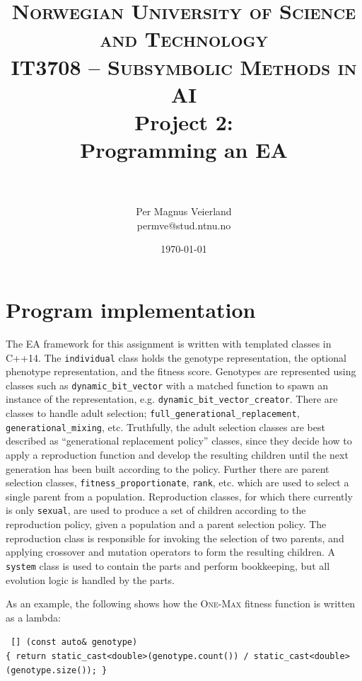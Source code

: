 \documentclass[paper=a4, fontsize=10pt]{scrartcl} %
\title{
\normalfont \normalsize
\textsc{Norwegian University of Science and Technology\\IT3708 -- Subsymbolic Methods in AI}
\horrule{0.5pt} \\[0.4cm]
\huge Project 2:\\ Programming an \acf{EA}\\
\horrule{2pt} \\[0.5cm]
}
\author{Per Magnus Veierland\\permve@stud.ntnu.no}
\date{\normalsize\today}
\begin{document}
\fancyfoot[C]{}
\maketitle

\newpage
{} %
\setcounter{page}{1}

\section*{Program implementation}

\setlength\parindent{17pt}
The \ac{EA} framework for this assignment is written with templated classes in \textsc{C++14}. The \texttt{individual} class holds the genotype representation, the optional phenotype representation, and the fitness score. Genotypes are represented using classes such as \texttt{dynamic\_bit\_vector} with a matched function to spawn an instance of the representation, e.g. \texttt{dynamic\_bit\_vector\_creator}. There are classes to handle adult selection; \texttt{full\_generational\_replacement}, \texttt{generational\_mixing}, etc. Truthfully, the adult selection classes are best described as ``generational replacement policy'' classes, since they decide how to apply a reproduction function and develop the resulting children until the next generation has been built according to the policy. Further there are parent selection classes, \texttt{fitness\_proportionate}, \texttt{rank}, etc. which are used to select a single parent from a population. Reproduction classes, for which there currently is only \texttt{sexual}, are used to produce a set of children according to the reproduction policy, given a population and a parent selection policy. The reproduction class is responsible for invoking the selection of two parents, and applying crossover and mutation operators to form the resulting children. A \texttt{system} class is used to contain the parts and perform bookkeeping, but all evolution logic is handled by the parts.

As an example, the following shows how the \textsc{One-Max} fitness function is written as a lambda:
\setlength\parindent{0pt}

\vspace{-0.35cm}

\begin{center}
{\scriptsize\texttt{
[] (const auto\& genotype)\\
\{ return static\_cast<double>(genotype.count()) / static\_cast<double>(genotype.size()); \}}}
\end{center}
\end{document}
